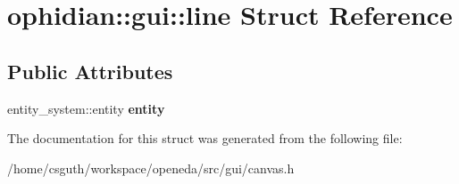 \hypertarget{structophidian_1_1gui_1_1line}{\section{ophidian\-:\-:gui\-:\-:line Struct Reference}
\label{structophidian_1_1gui_1_1line}
}
\subsection*{Public Attributes}
\begin{DoxyCompactItemize}
\item 
\hypertarget{structophidian_1_1gui_1_1line_acf0111e8404d564dbf052deef0cb77ac}{entity\-\_\-system\-::entity {\bfseries entity}}\label{structophidian_1_1gui_1_1line_acf0111e8404d564dbf052deef0cb77ac}

\end{DoxyCompactItemize}


The documentation for this struct was generated from the following file\-:\begin{DoxyCompactItemize}
\item 
/home/csguth/workspace/openeda/src/gui/canvas.\-h\end{DoxyCompactItemize}

